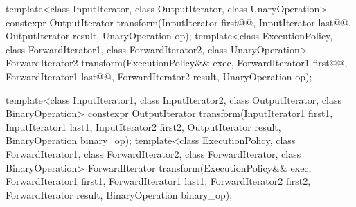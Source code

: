%
\begin{itemdecl}
template<class InputIterator, class OutputIterator,
         class UnaryOperation>
  constexpr OutputIterator
    transform(InputIterator first@@, InputIterator last@@,
              OutputIterator result, UnaryOperation op);
template<class ExecutionPolicy, class ForwardIterator1, class ForwardIterator2,
         class UnaryOperation>
  ForwardIterator2
    transform(ExecutionPolicy&& exec,
              ForwardIterator1 first@@, ForwardIterator1 last@@,
              ForwardIterator2 result, UnaryOperation op);

template<class InputIterator1, class InputIterator2,
         class OutputIterator, class BinaryOperation>
  constexpr OutputIterator
    transform(InputIterator1 first1, InputIterator1 last1,
              InputIterator2 first2, OutputIterator result,
              BinaryOperation binary_op);
template<class ExecutionPolicy, class ForwardIterator1, class ForwardIterator2,
         class ForwardIterator, class BinaryOperation>
  ForwardIterator
    transform(ExecutionPolicy&& exec,
              ForwardIterator1 first1, ForwardIterator1 last1,
              ForwardIterator2 first2, ForwardIterator result,
              BinaryOperation binary_op);
\end{itemdecl}
